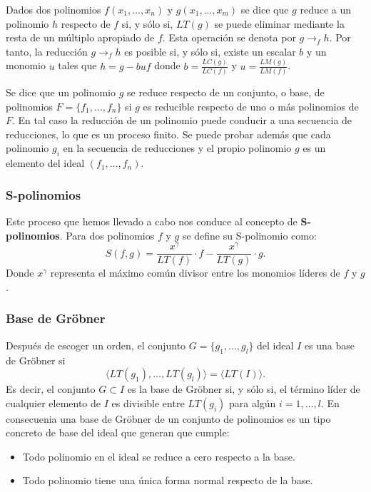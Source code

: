Dados dos polinomios $f(x_1, \dotso, x_n)$ y $g(x_1, \dotso, x_m)$ se dice que $g$ reduce a un polinomio $h$ respecto de $f$ si, y sólo si, $LT(g)$ se puede eliminar mediante la resta de un múltiplo apropiado de $f$. Esta operación se denota por $g \to_f h$.
Por tanto, la reducción $g \to_f h$ es posible si, y sólo si, existe un escalar $b$ y un monomio $u$ tales que $h = g - buf$ donde $b = \frac{LC(g)}{LC(f)}$ y $u =\frac{LM(g)}{LM(f)}$.

Se dice que un polinomio $g$ se reduce respecto de un conjunto, o base, de polinomios $F = \{ f_1, \dotso, f_n \}$ si $g$ es reducible respecto de uno o más polinomios de $F$. En tal caso la reducción de un polinomio puede conducir a una secuencia de reducciones, lo que es un proceso finito. Se puede probar además que cada polinomio $g_i$ en la secuencia de reducciones y el propio polinomio $g$ es un elemento del ideal $(f_1, \dotso, f_n)$.

\subsubsection*{S-polinomios}

Este proceso que hemos llevado a cabo nos conduce al concepto de \textbf{S-polinomios}. Para dos polinomios $f$ y $g$ se define su S-polinomio como:
$$S(f,g) = \frac{x^{\gamma}}{LT(f)} \cdot f - \frac{x^{\gamma}}{LT(g)} \cdot g.$$
Donde $x^{\gamma}$ representa el máximo común divisor entre los monomios líderes de $f$ y $g$.

\subsubsection*{Base de Gröbner}

Después de escoger un orden, el conjunto $G = \{ g_1, \dotso, g_l \}$ del ideal $I$ es una base de Gröbner si
$$\langle LT(g_1), \dotso, LT(g_l) \rangle = \langle LT(I) \rangle.$$
Es decir, el conjunto $G \subset I$ es la base de Gröbner si, y sólo si, el término líder de cualquier elemento de $I$ es divisible entre $LT(g_i)$ para algún $i = 1, \dotso, l$. En consecuenia una base de Gröbner de un conjunto de polinomios es un tipo concreto de base del ideal que generan que cumple:
\begin{itemize}
    \item Todo polinomio en el ideal se reduce a cero respecto a la base.
    \item Todo polinomio tiene una única forma normal respecto de la base.
\end{itemize}


